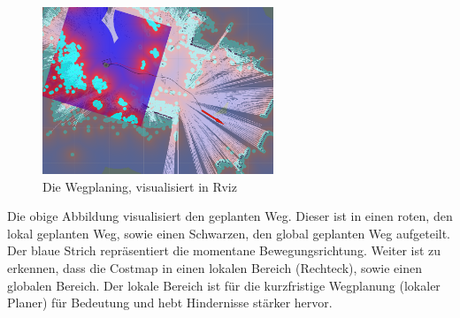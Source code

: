 {{{{{				\begin{figure}[H]
					\centering				\includegraphics[height=5cm]{Bilder/costmap_pathplanning.png}
					\caption{Die Wegplaning, visualisiert in Rviz} 
					\label{pic:costpathplanning}
				\end{figure}
				
				Die obige Abbildung visualisiert den geplanten Weg. Dieser ist in einen roten, den lokal geplanten Weg, sowie einen Schwarzen, den global geplanten Weg aufgeteilt. Der blaue Strich repräsentiert die momentane Bewegungsrichtung. Weiter ist zu erkennen, dass die Costmap in einen lokalen Bereich (Rechteck), sowie einen globalen Bereich. Der lokale Bereich ist für die kurzfristige Wegplanung (lokaler Planer) für Bedeutung und hebt Hindernisse stärker hervor.
				
			}
}}}}
